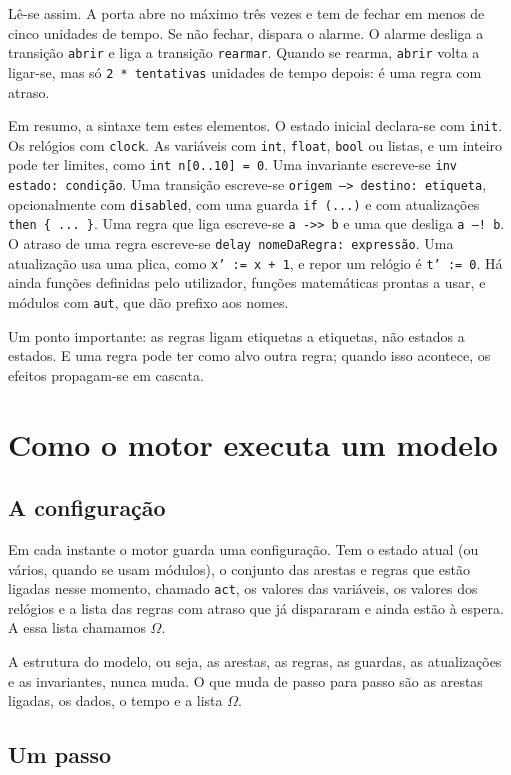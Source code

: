 \documentclass[11pt,a4paper]{article}
\newcommand{\code}[1]{\texttt{#1}}
\newcommand{\Om}{$\Omega$}
\begin{document}
Lê-se assim. A porta abre no máximo três vezes e tem de fechar em menos de cinco unidades de tempo. Se não fechar, dispara o alarme. O alarme desliga a transição \code{abrir} e liga a transição \code{rearmar}. Quando se rearma, \code{abrir} volta a ligar-se, mas só \code{2 * tentativas} unidades de tempo depois: é uma regra com atraso.

Em resumo, a sintaxe tem estes elementos. O estado inicial declara-se com \code{init}. Os relógios com \code{clock}. As variáveis com \code{int}, \code{float}, \code{bool} ou listas, e um inteiro pode ter limites, como \code{int n[0..10] = 0}. Uma invariante escreve-se \code{inv estado: condição}. Uma transição escreve-se \code{origem --> destino: etiqueta}, opcionalmente com \code{disabled}, com uma guarda \code{if (...)} e com atualizações \code{then \{ ... \}}. Uma regra que liga escreve-se \code{a ->> b} e uma que desliga \code{a --! b}. O atraso de uma regra escreve-se \code{delay nomeDaRegra: expressão}. Uma atualização usa uma plica, como \code{x' := x + 1}, e repor um relógio é \code{t' := 0}. Há ainda funções definidas pelo utilizador, funções matemáticas prontas a usar, e módulos com \code{aut}, que dão prefixo aos nomes.

Um ponto importante: as regras ligam etiquetas a etiquetas, não estados a estados. E uma regra pode ter como alvo outra regra; quando isso acontece, os efeitos propagam-se em cascata.

\section{Como o motor executa um modelo}

\subsection{A configuração}

Em cada instante o motor guarda uma configuração. Tem o estado atual (ou vários, quando se usam módulos), o conjunto das arestas e regras que estão ligadas nesse momento, chamado \code{act}, os valores das variáveis, os valores dos relógios e a lista das regras com atraso que já dispararam e ainda estão à espera. A essa lista chamamos \Om.

A estrutura do modelo, ou seja, as arestas, as regras, as guardas, as atualizações e as invariantes, nunca muda. O que muda de passo para passo são as arestas ligadas, os dados, o tempo e a lista \Om.

\subsection{Um passo}
\end{document}
